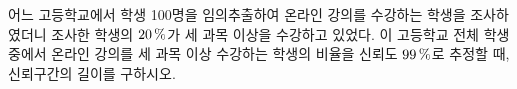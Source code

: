 어느 고등학교에서 학생 100명을 임의추출하여 온라인 강의를 수강하는 학생을 조사하였더니 조사한 학생의 $20\mkern3mu \%$가 세 과목 이상을 수강하고 있었다. 이 고등학교 전체 학생 중에서 온라인 강의를 세 과목 이상 수강하는 학생의 비율을 신뢰도 $99\mkern3mu \%$로 추정할 때, 신뢰구간의 길이를 구하시오. 
